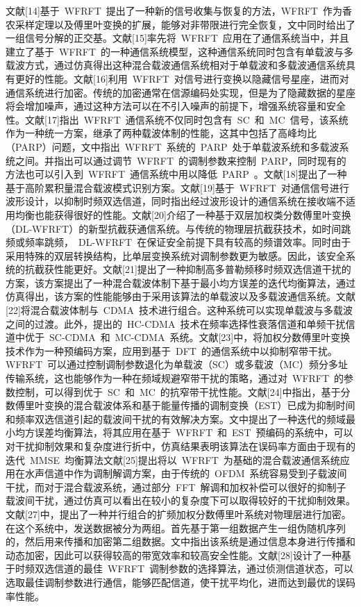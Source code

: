 文献[14]基于~WFRFT~提出了一种新的信号收集与恢复的方法，WFRFT~作为香农采样定理以及傅里叶变换的扩展，能够对非带限进行完全恢复，文中同时给出了一组信号分解的正交基。文献[15]率先将~WFRFT~应用在了通信系统当中，并且建立了基于~WFRFT~的一种通信系统模型，这种通信系统同时包含有单载波与多载波方式，通过仿真得出这种混合载波通信系统相对于单载波和多载波通信系统具有更好的性能。文献[16]利用~WFRFT~对信号进行变换以隐藏信号星座，进而对通信系统进行加密。传统的加密通常在信源编码处实现，但是为了隐藏数据的星座将会增加噪声，通过这种方法可以在不引入噪声的前提下，增强系统容量和安全性。文献[17]指出~WFRFT~通信系统不仅同时包含有~SC~和~MC~信号，该系统作为一种统一方案，继承了两种载波体制的性能，这其中包括了高峰均比（PARP）问题，文中指出~WFRFT~系统的~PARP~处于单载波系统和多载波系统之间。并指出可以通过调节~WFRFT~的调制参数来控制~PARP，同时现有的方法也可以引入到~WFRFT~通信系统中用以降低~PARP~。文献[18]提出了一种基于高阶累积量混合载波模式识别方案。文献[19]基于~WFRFT~对通信信号进行波形设计，以抑制时频双选信道，同时指出经过波形设计的通信系统在接收端不适用均衡也能获得很好的性能。文献[20]介绍了一种基于双层加权类分数傅里叶变换（DL-WFRFT）的新型抗截获通信系统。与传统的物理层抗截获技术，如时间跳频或频率跳频，~DL-WFRFT~在保证安全前提下具有较高的频谱效率。同时由于采用特殊的双层转换结构，比单层变换系统对调制参数更为敏感。因此，该安全系统的抗截获性能更好。文献[21]提出了一种抑制高多普勒频移时频双选信道干扰的方案，该方案提出了一种混合载波体制下基于最小均方误差的迭代均衡算法，通过仿真得出，该方案的性能能够由于采用该算法的单载波以及多载波通信系统。文献[22]将混合载波体制与~CDMA~技术进行组合。这种系统可以实现单载波与多载波之间的过渡。此外，提出的~HC-CDMA~技术在频率选择性衰落信道和单频干扰信道中优于~SC-CDMA~和~MC-CDMA~系统。文献[23]中，将加权分数傅里叶变换技术作为一种预编码方案，应用到基于~DFT~的通信系统中以抑制窄带干扰。WFRFT~可以通过控制调制参数退化为单载波（SC）或多载波（MC）频分多址传输系统，这也能够作为一种在频域规避窄带干扰的策略，通过对~WFRFT~的参数控制，可以得到优于~SC~和~MC~的抗窄带干扰性能。文献[24]中指出，基于分数傅里叶变换的混合载波体系和基于能量传播的调制变换（EST）已成为抑制时间和频率双选信道引起的载波间干扰的有效解决方案。文中提出了一种迭代的频域最小均方误差均衡算法，将其应用在基于~WFRFT~和~EST~预编码的系统中，可以对干扰抑制效果和复杂度进行折中，仿真结果表明该算法在误码率方面由于现有的迭代~MMSE~均衡算法文献[25]提出将以~WFRFT~为基础的混合载波通信系统应用在水声信道中作为调制解调方案，由于传统的~OFDM~系统容易受到子载波间干扰，而对于混合载波系统，通过部分~FFT~解调和加权补偿可以很好的抑制子载波间干扰，通过仿真可以看出在较小的复杂度下可以取得较好的干扰抑制效果。文献[27]中，提出了一种并行组合的扩频加权分数傅里叶系统对物理层进行加密。在这个系统中，发送数据被分为两组。首先基于第一组数据产生一组伪随机序列的，然后用来传播和加密第二组数据。文中指出该系统是通过信息本身进行传播和动态加密，因此可以获得较高的带宽效率和较高安全性能。文献[28]设计了一种基于时频双选信道的最佳~WFRFT~调制参数的选择算法，通过侦测信道状态，可以选取最佳调制参数进行通信，能够匹配信道，使干扰平均化，进而达到最优的误码率性能。

